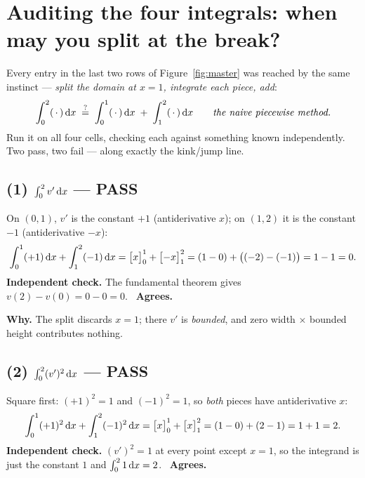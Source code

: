 \documentclass[11pt]{article}
\begin{document}
\section{Auditing the four integrals: when may you split at the break?}
\label{sec:audit}

Every entry in the last two rows of Figure~\ref{fig:master} was reached by the
same instinct --- \emph{split the domain at $x=1$, integrate each piece, add}:
\begin{equation}\label{eq:naive}
  \int_{0}^{2} (\,\cdot\,)\,\mathrm{d} x
  \;\overset{?}{=}\;
  \int_{0}^{1} (\,\cdot\,)\,\mathrm{d} x \;+\; \int_{1}^{2} (\,\cdot\,)\,\mathrm{d} x
  \qquad\text{\emph{the naive piecewise method.}}
\end{equation}
Run it on all four cells, checking each against something known independently.
Two pass, two fail --- along exactly the kink/jump line.

\subsection*{(1) $\int_{0}^{2} v'\,\mathrm{d} x$ --- \textcolor{MEFrame}{\textbf{PASS}}}

On $(0,1)$, $v'$ is the constant $+1$ (antiderivative $x$); on $(1,2)$ it is the
constant $-1$ (antiderivative $-x$):
\[
  \int_{0}^{1}(+1)\,\mathrm{d} x + \int_{1}^{2}(-1)\,\mathrm{d} x
  = \bigl[x\bigr]_{0}^{1} + \bigl[-x\bigr]_{1}^{2}
  = (1-0) + \bigl((-2)-(-1)\bigr)
  = 1 - 1 = 0 .
\]
\textbf{Independent check.} The fundamental theorem gives
$v(2)-v(0) = 0-0 = 0$. \ \textbf{Agrees.}

\textbf{Why.} The split discards $x=1$; there $v'$ is \emph{bounded}, and zero
width $\times$ bounded height contributes nothing.

\subsection*{(2) $\int_{0}^{2} (v')^{2}\,\mathrm{d} x$ --- \textcolor{MEFrame}{\textbf{PASS}}}

Square first: $(+1)^{2}=1$ and $(-1)^{2}=1$, so \emph{both} pieces have
antiderivative $x$:
\[
  \int_{0}^{1}(+1)^{2}\,\mathrm{d} x + \int_{1}^{2}(-1)^{2}\,\mathrm{d} x
  = \bigl[x\bigr]_{0}^{1} + \bigl[x\bigr]_{1}^{2}
  = (1-0) + (2-1)
  = 1 + 1 = 2 .
\]
\textbf{Independent check.} $(v')^{2}=1$ at every point except $x=1$, so the
integrand is just the constant $1$ and $\int_{0}^{2}1\,\mathrm{d} x = 2$. \ \textbf{Agrees.}
\end{document}
